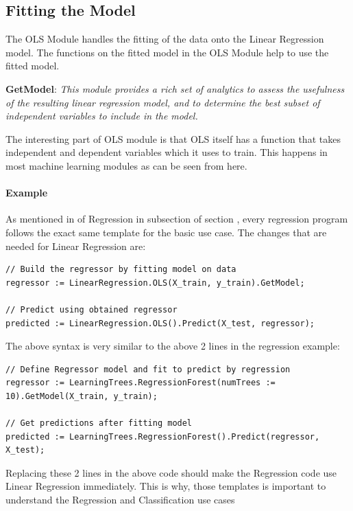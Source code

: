 \documentclass[a4paper,oneside,12pt]{book}
\begin{document}
\subsection{Fitting the Model}

The OLS Module handles the fitting of the data onto the Linear Regression model. The functions on the fitted model in the OLS Module help to use the fitted model. 

\textbf{GetModel}: \textit{This module provides a rich set of analytics to assess the usefulness of the resulting linear regression model, and to determine the best subset of independent variables to include in the model.}

The interesting part of OLS module is that OLS itself has a function that takes independent and dependent variables which it uses to train. This happens in most machine learning modules as can be seen from here.

\paragraph{Example}

As mentioned in  of Regression in  subsection of section , every regression program follows the exact same template for the basic use case. The changes that are needed for Linear Regression are:

\begin{lstlisting}
// Build the regressor by fitting model on data
regressor := LinearRegression.OLS(X_train, y_train).GetModel;

// Predict using obtained regressor
predicted := LinearRegression.OLS().Predict(X_test, regressor);
\end{lstlisting}

The above syntax is very similar to the above 2 lines in the regression example:

\begin{lstlisting}
// Define Regressor model and fit to predict by regression
regressor := LearningTrees.RegressionForest(numTrees := 10).GetModel(X_train, y_train);

// Get predictions after fitting model
predicted := LearningTrees.RegressionForest().Predict(regressor, X_test);
\end{lstlisting}

Replacing these 2 lines in the above code should make the Regression code use Linear Regression immediately. This is why, those templates is important to understand the Regression and Classification use cases
\end{document}
